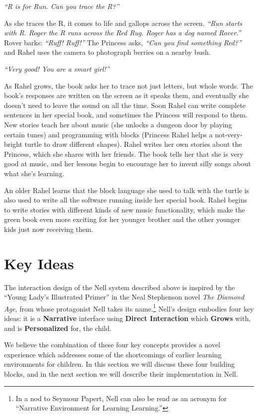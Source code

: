\documentclass[preprint]{sig-alternate}
\begin{document}
\textit{``R is for Run.  Can you trace the R?''}

As she traces the R, it comes to life and gallops across the screen.
\textit{``Run starts with R.  Roger the R runs across the Red Rug.
Roger has a dog named Rover.''}  Rover barks: \textit{``Ruff! Ruff!''}  The
Princess asks, \textit{``Can you find something Red?''} and Rahel uses the
camera to photograph berries on a nearby bush.

\textit{``Very good!  You are a smart girl!''}

As Rahel grows, the book asks her to trace not just letters, but whole
words.  The book's responses are written on the screen as it speaks
them, and eventually she doesn't need to leave the sound on all the
time.  Soon Rahel can write complete sentences in her special book,
and sometimes the Princess will respond to them.  New stories teach her about
music (she unlocks a dungeon door by playing certain tunes) and
programming with blocks (Princess Rahel helps a not-very-bright turtle
to draw different shapes).  Rahel writes her own stories about the Princess,
which she shares with her friends.  The book tells her that she is
very good at music, and her lessons begin to encourage her to invent
silly songs about what she's learning.

An older Rahel learns that the block language she used to talk with
the turtle is also used to write all the software running inside
her special book.  Rahel begins to write stories with different
kinds of new music functionality, which make the green book even more
exciting for her younger brother and the other younger kids just now
receiving them.

\section{Key Ideas}
The interaction design of the Nell system described above is inspired
by the ``Young Lady's Illustrated Primer'' in the Neal Stephenson
novel \textit{The Diamond Age}, from whose protagonist Nell takes its
name.\footnote{In a nod to Seymour Papert, Nell can also be read as an
acronym for ``Narrative Environment for Learning Learning.''}
Nell's design embodies four key ideas: it is a \textbf{Narrative}
interface using \textbf{Direct Interaction} which \textbf{Grows} with,
and is \textbf{Personalized} for, the child.

We believe the combination of these four key concepts provides a novel
experience which addresses some of the shortcomings of earlier
learning environments for children.  In this section we will discuss
these four building blocks, and in the next section we will describe their
implementation in Nell.
\end{document}
